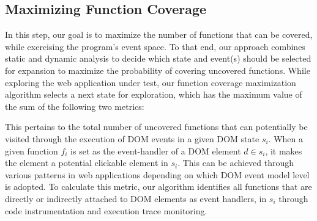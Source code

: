 \subsection{Maximizing Function Coverage} 
\label{Sec:funcCovg}

%
In this step, our goal is to maximize the number of functions that can be covered, while exercising the program's event space. 
To that end, our approach combines static and dynamic analysis to decide which state and event(s) should be selected for expansion to maximize the probability of covering uncovered \javascript functions. While exploring the web application under test, our function coverage maximization algorithm 
selects a next state for exploration, which has the maximum value of the sum of the following two metrics:

  This pertains to 
the total number of uncovered functions that can potentially be visited through the execution of DOM events in a given DOM state $s_i$. When a given function $f_i$ is set as the event-handler of a DOM element $d \in s_i$, it makes the element a potential clickable element in $s_i$. This can be achieved through various patterns in web applications depending on which DOM event model level is adopted. To calculate this metric, our algorithm identifies all \javascript functions that are directly or indirectly attached to DOM elements as event handlers, in $s_i$ through code instrumentation and execution trace monitoring.  
%


